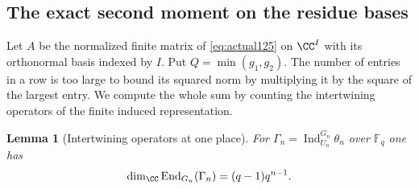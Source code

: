 \documentclass[a4paper,11pt]{article}
\newtheorem{lemma}[proposition]{Lemma}
\theoremstyle{definition}
\theoremstyle{remark}
\numberwithin{equation}{section}
\begin{document}
\subsection{The exact second moment on the residue bases}\label{nav:VI-14}
\label{sec:moment126}

Let \(A\) be the normalized finite matrix of \eqref{eq:actual125} on
\(\CC^I\) with its orthonormal basis indexed by \(I\). Put \(Q=\min(g_1,g_2)\).
The number of entries in a row is too large to bound its squared
norm by multiplying it by the square of the largest entry. We
compute the whole sum by counting the intertwining operators of
the finite induced representation.

\begin{lemma}[Intertwining operators at one place]\label{lem:intertwine126}
For \(\Gamma_n=\operatorname{Ind}_{U_n}^{G_n}\theta_n\) over
\(\mathbb F_q\) one has
\[
            \dim_{\CC}\operatorname{End}_{G_n}(\Gamma_n)
                         =(q-1)q^{n-1}.
\]
\end{lemma}
\end{document}
